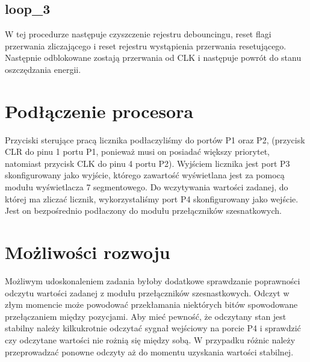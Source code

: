 \documentclass[fleqn]{article}
\begin{document}
\subsection{loop\_3}

		W tej procedurze następuje czyszczenie rejestru debouncingu, reset flagi przerwania zliczającego i reset rejestru wystąpienia przerwania resetującego. Następnie odblokowane zostają przerwania od CLK i następuje powrót do stanu oszczędzania energii.






\pagebreak



\pagebreak

\section{Podłączenie procesora}


Przyciski sterujące pracą licznika podłaczyliśmy do portów P1 oraz P2, (przycisk CLR do pinu 1 portu P1, ponieważ musi on posiadać większy priorytet, natomiast przycisk CLK do pinu 4 portu P2). Wyjściem licznika jest port P3 skonfigurowany jako wyjście, którego zawartość wyświetlana jest za pomocą modułu wyświetlacza 7 segmentowego. Do wczytywania wartości zadanej, do której ma zliczać licznik, wykorzystaliśmy port P4 skonfigurowany jako wejście. Jest on bezpośrednio podłaczony do modułu przełączników szesnatkowych.

\section{Możliwości rozwoju}

Możliwym udoskonaleniem zadania byłoby dodatkowe sprawdzanie poprawności odczytu wartości zadanej z modułu przełączników szesnastkowych. Odczyt w złym momencie może powodować przekłamania niektórych bitów spowodowane przełączaniem między pozycjami. Aby mieć pewność, że odczytany stan jest stabilny należy kilkukrotnie odczytać sygnał wejściowy na porcie P4 i sprawdzić czy odczytane wartości nie rożnią się między sobą. W przypadku różnic należy przeprowadzać ponowne odczyty aż do momentu uzyskania wartości stabilnej.
\end{document}
